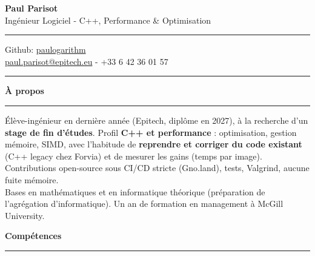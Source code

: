 \documentclass[9pt]{extarticle}
\begin{document}
\begin{center}
	{\huge\bfseries Paul Parisot}
	\\[4pt]
	{\Large Ingénieur Logiciel - C++, Performance \& Optimisation}
	\\
\end{center}

\par\vspace{-5pt}
\rule{\linewidth}{0.4pt}
\par\vspace{-5pt}

\begin{center}
	Github: \href{https://github.com/paulogarithm}{paulogarithm}
	\\
	\href{mailto:paul.parisot@epitech.eu}{paul.parisot@epitech.eu} - +33 6 42 36 01 57
	\\
\end{center}

\par\vspace{-10pt}
\rule{\linewidth}{0.4pt}
\par\vspace{7pt}

{\large\bfseries À propos}
\par\vspace{-8pt}
\rule{\linewidth}{0.4pt}
\par\vspace{5pt}

Élève-ingénieur en dernière année (Epitech, diplôme en 2027), à la recherche d'un {\bfseries stage de fin d'études}. Profil {\bfseries C++ et performance} : optimisation, gestion mémoire, SIMD, avec l'habitude de {\bfseries reprendre et corriger du code existant} (C++ legacy chez Forvia) et de mesurer les gains (temps par image).
\\
Contributions open-source sous CI/CD stricte (Gno.land), tests, Valgrind, aucune fuite mémoire.
\\
Bases en mathématiques et en informatique théorique (préparation de l'agrégation d'informatique). Un an de formation en management à McGill University.
\par\vspace{5pt}

{\large\bfseries Compétences}
\par\vspace{-8pt}
\rule{\linewidth}{0.4pt}
\par\vspace{5pt}
\end{document}
